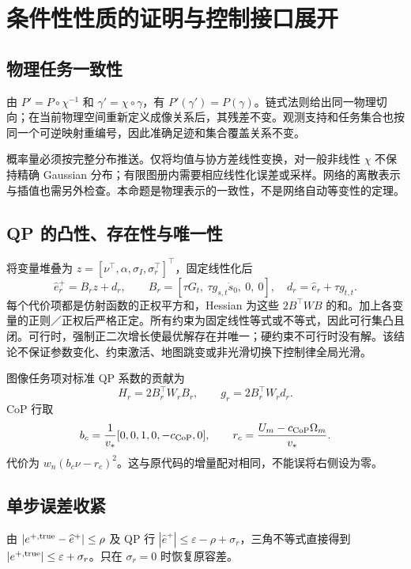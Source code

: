 \documentclass[UTF8,11pt,a4paper,fontset=fandol]{ctexart}
\numberwithin{equation}{section}
\theoremstyle{definition}
\begin{document}
\section{条件性性质的证明与控制接口展开}
\label{app:proofs}
\subsection{物理任务一致性}
由 $P'=P\circ\chi^{-1}$ 和 $\gamma'=\chi\circ\gamma$，有 $P'(\gamma')=P(\gamma)$。链式法则给出同一物理切向；在当前物理空间重新定义成像关系后，其残差不变。观测支持和任务集合也按同一个可逆映射重编号，因此准确足迹和集合覆盖关系不变。

概率量必须按完整分布推送。仅将均值与协方差线性变换，对一般非线性 $\chi$ 不保持精确 Gaussian 分布；有限图册内需要相应线性化误差或采样。网络的离散表示与插值也需另外检查。本命题是物理表示的一致性，不是网络自动等变性的定理。

\subsection{QP 的凸性、存在性与唯一性}
将变量堆叠为 $z=[\nu^\top,\alpha,\sigma_I,\sigma_r^\top]^\top$，固定线性化后
\begin{equation}
\widehat e_r^+=B_rz+d_r,\qquad
B_r=[\tau G_t,\ \tau g_{s,t}\dot s_0,\ 0,\ 0],\quad
d_r=\widehat e_r+\tau g_{t,t}.
\label{eq:qpmatrix}
\end{equation}
每个代价项都是仿射函数的正权平方和，Hessian 为这些 $2B^\top WB$ 的和。加上各变量的正则／正权后严格正定。所有约束为固定线性等式或不等式，因此可行集凸且闭。可行时，强制正二次增长使最优解存在并唯一；硬约束不可行时没有解。该结论不保证参数变化、约束激活、地图跳变或非光滑切换下控制律全局光滑。

图像任务项对标准 QP 系数的贡献为
\begin{equation}
H_r=2B_r^\top W_rB_r,\qquad g_r=2B_r^\top W_rd_r.
\end{equation}
CoP 行取
\begin{equation}
b_c=\frac{1}{v_*}[0,0,1,0,-c_{\rm CoP},0],\qquad
r_c=\frac{U_m-c_{\rm CoP}\Omega_m}{v_*}.
\end{equation}
代价为 $w_n(b_c\nu-r_c)^2$。这与原代码的增量配对相同，不能误将右侧设为零。

\subsection{单步误差收紧}
由 $|e^{+,\rm true}-\widehat e^+|\le\rho$ 及 QP 行 $|\widehat e^+|\le\varepsilon-\rho+\sigma_r$，三角不等式直接得到 $|e^{+,\rm true}|\le\varepsilon+\sigma_r$。只在 $\sigma_r=0$ 时恢复原容差。
\end{document}
